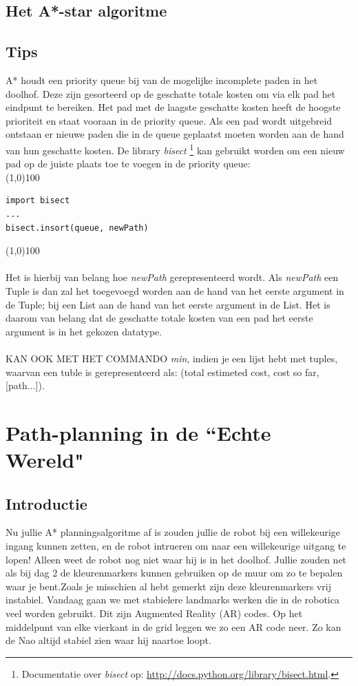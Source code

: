 \documentclass[a4paper, twoside]{article}
\begin{document}
\subsection{Het A*-star algoritme}
\subsection{Tips}
A* houdt een priority queue bij van de mogelijke incomplete paden in het doolhof. Deze zijn gesorteerd op de geschatte totale kosten om via elk pad het eindpunt te bereiken. Het pad met de laagste geschatte kosten heeft de hoogste prioriteit en staat vooraan in de priority queue. Als een pad wordt uitgebreid ontstaan er nieuwe paden die in de queue geplaatst moeten worden aan de hand van hun geschatte kosten. De library \textit{bisect} \footnote{Documentatie over \textit{bisect} op: \url{http://docs.python.org/library/bisect.html}.} kan gebruikt worden om een nieuw pad op de juiste plaats toe te voegen in de priority queue:\\
\noindent \line(1,0){100}
\begin{verbatim}
import bisect
...
bisect.insort(queue, newPath)
\end{verbatim}
\noindent \line(1,0){100}
\\\\
Het is hierbij van belang hoe \textit{newPath} gerepresenteerd wordt. Als \textit{newPath} een Tuple is dan zal het toegevoegd worden aan de hand van het eerste argument in de Tuple; bij een List aan de hand van het eerste argument in de List. Het is daarom van belang dat de geschatte totale kosten van een pad het eerste argument is in het gekozen datatype. 
\\
\\
KAN OOK MET HET COMMANDO \textit{min}, indien je een lijst hebt met tuples, waarvan een tuble is gerepresenteerd als: (total estimeted cost, cost so far, [path...]).
\cleardoublepage

\section{Path-planning in de ``Echte Wereld"}
\subsection{Introductie}
Nu jullie A* planningsalgoritme af is zouden jullie de robot bij een willekeurige ingang kunnen zetten, en de robot intrueren om naar een willekeurige uitgang te lopen! Alleen weet de robot nog niet waar hij is in het doolhof. Jullie zouden net als bij dag 2 de kleurenmarkers kunnen gebruiken op de muur om zo te bepalen waar je bent.Zoals je misschien al hebt gemerkt zijn deze kleurenmarkers vrij instabiel. Vandaag gaan we met stabielere landmarks werken die in de robotica veel worden gebruikt. Dit zijn Augmented Reality (AR) codes. Op het middelpunt van elke vierkant in de grid leggen we zo een AR code neer. Zo kan de Nao altijd stabiel zien waar hij naartoe loopt.
\end{document}
